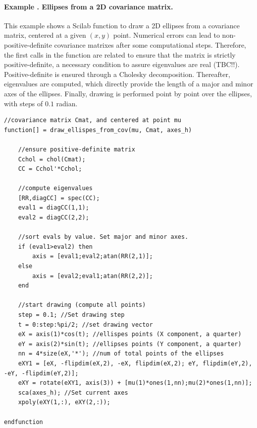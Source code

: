 \paragraph{Example \theexamplecounter. Ellipses from a 2D covariance matrix.}
This example shows a Scilab function to draw a 2D ellipses from a covariance matrix, centered at a given $(x,y)$ point. Numerical errors can lead to non-positive-definite covariance matrixes after some computational steps. Therefore, the first calls in the function are related to ensure that the matrix is strictly positive-definite, a necessary condition to assure eigenvalues are real (TBC!!). Positive-definite is ensured through a Cholesky decomposition. Thereafter, eigenvalues are computed, which directly provide the length of a major and minor axes of the ellipses. Finally, drawing is performed point by point over the ellipses, with steps of $0.1$ radian. 
\begin{mdframed}
\tiny
\begin{verbatim} 
//covariance matrix Cmat, and centered at point mu
function[] = draw_ellispes_from_cov(mu, Cmat, axes_h)

    //ensure positive-definite matrix
    Cchol = chol(Cmat);
    CC = Cchol'*Cchol;  
    
    //compute eigenvalues
    [RR,diagCC] = spec(CC);
    eval1 = diagCC(1,1);
    eval2 = diagCC(2,2);
    
    //sort evals by value. Set major and minor axes.
    if (eval1>eval2) then
        axis = [eval1;eval2;atan(RR(2,1)];
    else
        axis = [eval2;eval1;atan(RR(2,2)];
    end

    //start drawing (compute all points) 
    step = 0.1; //Set drawing step    
    t = 0:step:%pi/2; //set drawing vector
    eX = axis(1)*cos(t); //ellispes points (X component, a quarter)
    eY = axis(2)*sin(t); //ellipses points (Y component, a quarter)
    nn = 4*size(eX,'*'); //num of total points of the ellipses
    eXY1 = [eX, -flipdim(eX,2), -eX, flipdim(eX,2); eY, flipdim(eY,2), -eY, -flipdim(eY,2)];
    eXY = rotate(eXY1, axis(3)) + [mu(1)*ones(1,nn);mu(2)*ones(1,nn)];
    sca(axes_h); //Set current axes
    xpoly(eXY(1,:), eXY(2,:));

endfunction
\end{verbatim} 
\end{mdframed}






